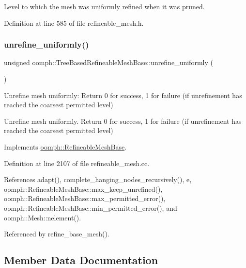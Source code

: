 Level to which the mesh was uniformly refined when it was pruned. 



Definition at line 585 of file refineable\+\_\+mesh.\+h.

\mbox{\label{classoomph_1_1TreeBasedRefineableMeshBase_a52940028ba9f6472df7e7c65be265057}} 
\subsubsection{\texorpdfstring{unrefine\+\_\+uniformly()}{unrefine\_uniformly()}}
{\footnotesize\ttfamily unsigned oomph\+::\+Tree\+Based\+Refineable\+Mesh\+Base\+::unrefine\+\_\+uniformly (\begin{DoxyParamCaption}{ }\end{DoxyParamCaption})\hspace{0.3cm}{\ttfamily [virtual]}}



Unrefine mesh uniformly\+: Return 0 for success, 1 for failure (if unrefinement has reached the coarsest permitted level) 

Unrefine mesh uniformly. Return 0 for success, 1 for failure (if unrefinement has reached the coarsest permitted level) 

Implements \hyperlink{classoomph_1_1RefineableMeshBase_a5bbd5c85e7c5c9e75c5a28155ac3f956}{oomph\+::\+Refineable\+Mesh\+Base}.



Definition at line 2107 of file refineable\+\_\+mesh.\+cc.



References adapt(), complete\+\_\+hanging\+\_\+nodes\+\_\+recursively(), e, oomph\+::\+Refineable\+Mesh\+Base\+::max\+\_\+keep\+\_\+unrefined(), oomph\+::\+Refineable\+Mesh\+Base\+::max\+\_\+permitted\+\_\+error(), oomph\+::\+Refineable\+Mesh\+Base\+::min\+\_\+permitted\+\_\+error(), and oomph\+::\+Mesh\+::nelement().



Referenced by refine\+\_\+base\+\_\+mesh().



\subsection{Member Data Documentation}
\mbox{\label{classoomph_1_1TreeBasedRefineableMeshBase_aaf121b2595ff71815c4e9db35247f951}} 

